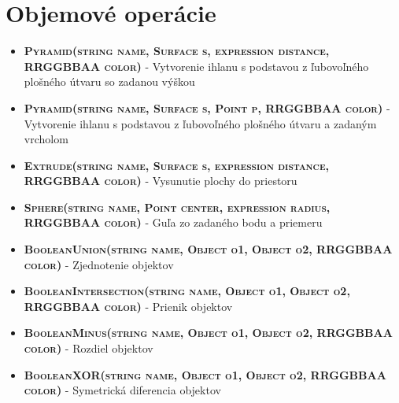 \section*{Objemové operácie}

\begin{itemize}
\item \textsc{\textbf{Pyramid(string name, Surface s, expression distance, RRGGBBAA color)}} - Vytvorenie ihlanu s podstavou z ľubovoľného plošného útvaru so zadanou výškou%

\item \textsc{\textbf{Pyramid(string name, Surface s, Point p, RRGGBBAA color)}} - Vytvorenie ihlanu s podstavou z ľubovoľného plošného útvaru a zadaným vrcholom%

\item \textsc{\textbf{Extrude(string name, Surface s, expression distance, RRGGBBAA color)}}  - Vysunutie plochy do priestoru%


\item \textsc{\textbf{Sphere(string name, Point center, expression radius, RRGGBBAA color)}} - Guľa zo zadaného bodu a priemeru

\item \textsc{\textbf{BooleanUnion(string name, Object o1, Object o2, RRGGBBAA color)}} - Zjednotenie objektov
\item \textsc{\textbf{BooleanIntersection(string name, Object o1, Object o2, RRGGBBAA color)}} - Prienik objektov%
\item \textsc{\textbf{BooleanMinus(string name, Object o1, Object o2, RRGGBBAA color)}} - Rozdiel objektov%
\item \textsc{\textbf{BooleanXOR(string name, Object o1, Object o2, RRGGBBAA color)}} - Symetrická diferencia objektov%
\end{itemize}